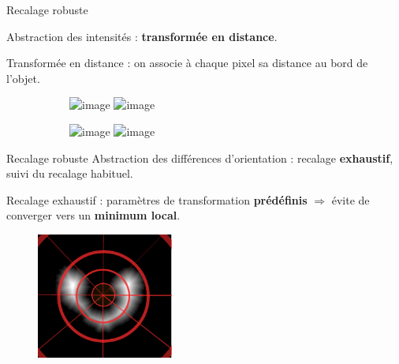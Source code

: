 \documentclass[10pt]{beamer}
\begin{document}
\begin{frame}{Recalage robuste}

  Abstraction des intensités : \textbf{transformée en distance}.

  \alert{Transformée en distance} : on associe à chaque pixel sa distance au bord de l'objet.

  \begin{figure}[ht]
    \centering
    \begin{subfigure}[t]{0.5\textwidth}
      \centering
      \includegraphics<1>[width=0.65\textwidth]{fig/mri_slice6.png}%
      \includegraphics<2>[width=0.65\textwidth]{fig/mri_slice6_dt.png}
      \caption{}
      \label{subfig:mri_slice6_dt.png}
    \end{subfigure}%
    \begin{subfigure}[t]{0.5\textwidth}
      \centering
      \includegraphics<1>[width=0.65\textwidth]{fig/maldi_slice6.png}%
      \includegraphics<2>[width=0.65\textwidth]{fig/maldi_slice6_dt.png}
      \caption{}
      \label{subfig:maldi_slice6_dt.png}
    \end{subfigure}%
  \end{figure}

  
\end{frame}

\begin{frame}{Recalage robuste}
  Abstraction des différences d'orientation : recalage \textbf{exhaustif}, suivi du recalage habituel.

  \alert{Recalage exhaustif} : paramètres de transformation \textbf{prédéfinis} $\Rightarrow$ évite de converger vers un \textbf{minimum local}.

  \begin{figure}[ht]
    \centering
    \includegraphics[width=0.4\textwidth]{fig/exhaustive_registration}
    \caption{}
    \label{fig:exhaustive_registration}
  \end{figure}

  
\end{frame}
\end{document}
